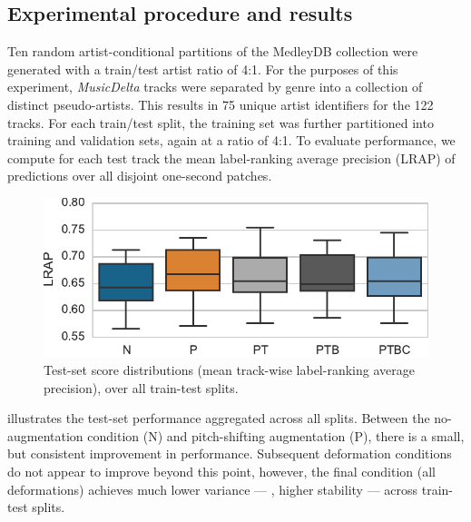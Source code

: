 \documentclass{article}
\begin{document}
\subsection{Experimental procedure and results}

Ten random artist-conditional partitions of the MedleyDB collection were generated with
a train/test artist ratio of 4:1.  For the purposes of this experiment,
\emph{MusicDelta} tracks were separated by genre into a collection of distinct 
pseudo-artists. 
This results in 75 unique artist identifiers for the 122 tracks.
For each train/test split, the training set was further partitioned into
training and validation sets, again at a ratio of 4:1.
To evaluate performance, we compute for each test track the mean label-ranking average
precision (LRAP) of predictions over all disjoint one-second patches.


\begin{figure}
    \centering
    \includegraphics[width=\columnwidth]{figs/lrapall}
    \caption{Test-set score distributions (mean track-wise label-ranking average
        precision), over all train-test splits.\label{lrapresults}}
\end{figure}

 illustrates the test-set performance aggregated across all splits. 
Between the no-augmentation condition (N) and pitch-shifting augmentation (P), 
there is a small, but consistent improvement in performance.
Subsequent deformation conditions do not appear to improve beyond this point, however,
the final condition (all deformations) achieves much lower variance --- \ie, higher
stability --- across train-test splits.
\end{document}
